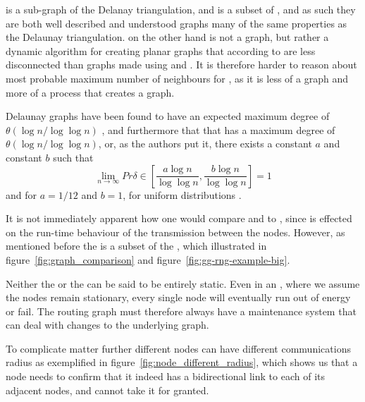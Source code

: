 \gabe is a sub-graph of the Delanay triangulation, and \rng is a subset of \gabe {}, and as such they are both well described and understood graphs many of the same properties as the Delaunay triangulation. \cldp on the other hand is not a graph, but rather a dynamic algorithm for creating planar graphs that according to \cite{practical} are less disconnected than graphs made using \gabe and \rng. It is therefore harder to reason about most probable maximum number of neighbours for \cldp, as it is less of a graph and more of a process that creates a graph. 


Delaunay graphs have been found to have an expected maximum degree of $\theta(\log n / \log \log n)$ \cite{delExpected}, and furthermore that that \gabe has a maximum degree of $\theta(\log n / \log \log n)$, or, as the authors put it, there exists a constant $a$ and constant $b$ such that 
$$
\lim_{n \rightarrow \infty} Pr{\delta \in [\frac{a\log n}{\log \log n}, \frac{b\log n}{\log \log n}]} = 1
$$
and for \gabe $a = 1/12$ and $b = 1$, for uniform distributions \cite{GGExpected}.

It is not immediately apparent how one would compare \gabe and \rng to \cldp, since \cldp is effected on the run-time behaviour of the transmission between the nodes. However, as mentioned before the \rng is a subset of the \gabe, which illustrated in figure~\ref{fig:graph_comparison} and figure~\ref{fig:gg-rng-example-big}.


Neither the \manet or the \anet can be said to be entirely static. Even in an \anet, where we assume the nodes remain stationary, every single node will eventually run out of energy or fail. The routing graph must therefore always have a maintenance system that can deal with changes to the underlying graph. 

To complicate matter further different nodes can have different communications radius as exemplified in figure~\ref{fig:node_different_radius}, which shows us that a node needs to confirm that it indeed has a bidirectional link to each of its adjacent nodes, and cannot take it for granted.

